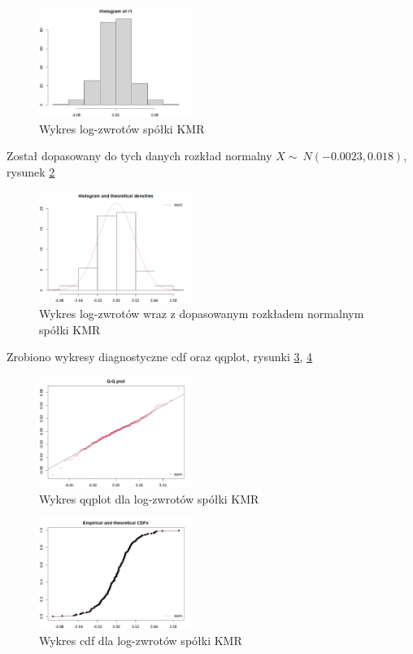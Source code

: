 \documentclass[a4paper,11pt]{article}
\begin{document}
\begin{figure}[!htb]
	\centering
	\includegraphics[width=5cm]{kmr_hist_log.png}
	\caption{Wykres log-zwrotów spółki KMR}
        \label{fig:kmr_hist_log}
\end{figure}

Został dopasowany do tych danych rozkład normalny $X \sim\ N(-0.0023, 0.018)$, rysunek \ref{fig:kmr_histwykres_log}
\begin{figure}[!htb]
	\centering
	\includegraphics[width=5cm]{kmr_histW_log.png}
	\caption{Wykres log-zwrotów wraz z dopasowanym rozkładem normalnym spółki KMR}
         \label{fig:kmr_histwykres_log}
\end{figure}

Zrobiono wykresy diagnostyczne cdf oraz qqplot, rysunki \ref{fig:kmr_qqplot_log}, \ref{fig:kmr_cdf_log}

\begin{figure}[!htb]
	\centering
	\includegraphics[width=5cm]{kmr_qqplot_log.png}
	\caption{Wykres qqplot dla log-zwrotów spółki KMR}
         \label{fig:kmr_qqplot_log}
\end{figure}

\begin{figure}[!htb]
	\centering
	\includegraphics[width=5cm]{kmr_cdf_log.png}
	\caption{Wykres cdf dla log-zwrotów spółki KMR}
         \label{fig:kmr_cdf_log}
\end{figure}
\end{document}
